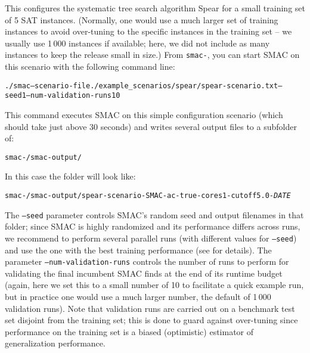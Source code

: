 \documentclass[11pt,letterpaper,twoside]{article}
\begin{document}
This configures the systematic tree search algorithm Spear for a small training set of 5 SAT instances.
(Normally, one would use a much larger set of training instances to avoid over-tuning to the specific instances in the training set -- we usually use 1\,000 instances if available; here, we did not include as many instances to keep the release small in size.)
%
From \texttt{smac-}\unskip, you can start SMAC on this scenario with the following command line:

{\footnotesize
\begin{alltt}
./smac --scenario-file ./example_scenarios/spear/spear-scenario.txt --seed 1 --num-validation-runs 10
\end{alltt}}

This command executes SMAC on this simple configuration scenario (which should take just above 30 seconds) and writes several output files to a subfolder of: 

{\footnotesize
\begin{alltt}
smac-\version\unskip/smac-output/
\end{alltt}}

In this case the folder will look like:

{\footnotesize
\begin{alltt}
smac-\version\unskip/smac-output/spear-scenario-SMAC-ac-true-cores1-cutoff5.0-\textit{DATE}
\end{alltt}}
The \texttt{--seed} parameter controls SMAC's random seed and output filenames in that folder; since SMAC is highly randomized and its performance differs across runs, we recommend to perform several parallel runs (with different values for \texttt{--seed}) and use the one with the best training performance (see \cite{HutHooLey12-ParallelAC} for details).
The parameter \texttt{--num-validation-runs} controls the number of runs to perform for validating the final incumbent SMAC finds at the end of its runtime budget (again, here we set this to a small number of 10 to facilitate a quick example run, but in practice one would use a much larger number, \eg{} the default of 1\,000 validation runs). Note that validation runs are carried out on a benchmark test set disjoint from the training set; this is done to guard against over-tuning since performance on the training set is a biased (optimistic) estimator of generalization performance.

\end{document}
